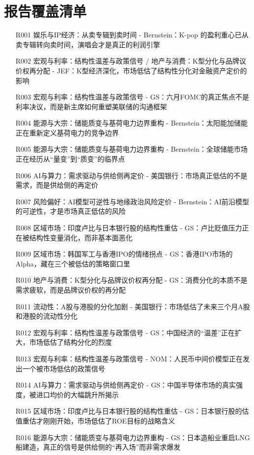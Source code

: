 \documentclass[11pt]{ctexart}
\begin{document}
\section{报告覆盖清单}
\begin{itemize}
  \item [R001] 娱乐与IP经济：从卖专辑到卖时间 - Bernstein：K-pop 的盈利重心已从卖专辑转向卖时间，演唱会才是真正的利润引擎
  \item [R002] 宏观与利率：结构性温差与政策信号 / 地产与消费：K型分化与品牌议价权再分配 - JEF：K型经济深化，市场低估了结构性分化对金融资产定价的影响
  \item [R003] 宏观与利率：结构性温差与政策信号 - GS：六月FOMC的真正焦点不是利率决议，而是新主席如何重塑美联储的沟通框架
  \item [R004] 能源与大宗：储能质变与基荷电力边界重构 - Bernstein：太阳能加储能正在重新定义基荷电力的竞争边界
  \item [R005] 能源与大宗：储能质变与基荷电力边界重构 - Bernstein：全球储能市场正在经历从“量变”到“质变”的临界点
  \item [R006] AI与算力：需求驱动与供给侧再定价 - 美国银行：市场真正低估的不是需求，而是供给侧的再定价
  \item [R007] 风险偏好：AI模型可逆性与地缘政治风险定价 - Bernstein：AI前沿模型的可逆性，才是市场真正低估的风险
  \item [R008] 区域市场：印度卢比与日本银行股的结构性重估 - GS：卢比贬值压力正在被结构性变量消化，而非基本面恶化
  \item [R009] 区域市场：韩国军工与香港IPO的情绪拐点 - GS：香港IPO市场的Alpha，藏在三个被低估的策略窗口里
  \item [R010] 地产与消费：K型分化与品牌议价权再分配 - GS：消费分化的本质不是需求疲软，而是品牌议价权的再分配
  \item [R011] 流动性：A股与港股的分化加剧 - 美国银行：市场低估了未来三个月A股和港股的流动性分化
  \item [R012] 宏观与利率：结构性温差与政策信号 - GS：中国经济的“温差”正在扩大，市场低估了结构分化的烈度
  \item [R013] 宏观与利率：结构性温差与政策信号 - NOM：人民币中间价模型正在发出一个被市场低估的政策信号
  \item [R014] AI与算力：需求驱动与供给侧再定价 - GS：中国半导体市场的真实强度，被进口均价的大幅跳升所揭示
  \item [R015] 区域市场：印度卢比与日本银行股的结构性重估 - GS：日本银行股的估值重估才刚刚开始，市场低估了ROE目标的战略含义
  \item [R016] 能源与大宗：储能质变与基荷电力边界重构 - GS：日本造船业重启LNG船建造，真正的信号是供给侧的“再入场”而非需求爆发

\end{itemize}
\end{document}

